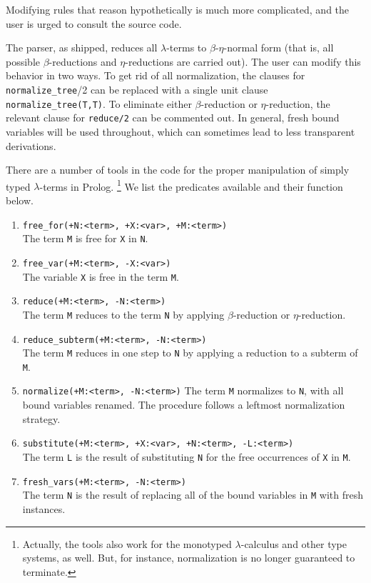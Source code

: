 Modifying rules that reason hypothetically is much more complicated,
and the user is urged to consult the source code.  




The parser, as shipped, reduces all $\lambda$-terms to
$\beta$-$\eta$-normal form (that is, all possible $\beta$-reductions
and $\eta$-reductions are carried out).  The user can modify this
behavior in two ways.  To get rid of all normalization, the clauses
for {\tt normalize\_tree}/2 can be replaced with a single unit clause
{\tt normalize\_tree(T,T)}.  To eliminate either $\beta$-reduction or
$\eta$-reduction, the relevant clause for {\tt reduce/2} can be
commented out.  In general, fresh bound variables will be used
throughout, which can sometimes lead to less transparent derivations.

There are a number of tools in the code for the proper manipulation of
simply typed $\lambda$-terms in Prolog.%
%
\footnote{Actually, the tools also work for the monotyped
$\lambda$-calculus and other type systems, as well.  But, for
instance, normalization is no longer guaranteed to terminate.}
%
We list the predicates available and their function below.  
%
\begin{enumerate}
\item  {\tt free\_for(+N:<term>, +X:<var>, +M:<term>)} \\
The term {\tt M} is free for {\tt X} in {\tt N}.  
%
\item  {\tt free\_var(+M:<term>, -X:<var>)} \\
The variable {\tt X} is free in the term {\tt M}.
%
\item {\tt reduce(+M:<term>, -N:<term>)} \\
The term {\tt M} reduces to the term {\tt N} by applying
$\beta$-reduction or $\eta$-reduction.
%
\item {\tt reduce\_subterm(+M:<term>, -N:<term>)} \\
The term {\tt M} reduces in one step to {\tt N} by applying a
reduction to a subterm of {\tt M}.
%
\item  {\tt normalize(+M:<term>, -N:<term>)}
The term {\tt M} normalizes to {\tt N}, with all bound variables
renamed.  The procedure follows a leftmost normalization strategy.
%
\item  {\tt substitute(+M:<term>, +X:<var>, +N:<term>, -L:<term>)} \\
The term {\tt L} is the result of substituting {\tt N} for the free
occurrences of {\tt X} in {\tt M}.
%
\item  {\tt fresh\_vars(+M:<term>, -N:<term>)} \\
The term {\tt N} is the result of replacing all of the bound variables
in {\tt M} with fresh instances.
%
\end{enumerate}


